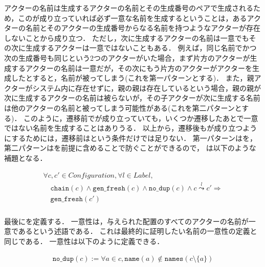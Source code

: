 アクターの名前は生成するアクターの名前とその生成番号のペアで生成されるため，この\fresh が成り立っていれば必ず一意な名前を生成するということは，あるアクターの名前とそのアクターの生成番号からなる名前を持つようなアクターが存在しないことから成り立つ．
ただし，次に生成するアクターの名前は一意でもその次に生成するアクターは一意ではないこともある．
例えば，同じ名前でかつ次の生成番号も同じという2つのアクターがいた場合，まず片方のアクターが生成するアクターの名前は一意だが，その次にもう片方のアクターがアクターを生成したとすると，名前が被ってしまう(これを第一パターンとする)．
また，親アクターがシステム内に存在せずに，親の親は存在しているという場合，親の親が次に生成するアクターの名前は被らないが，その子アクターが次に生成する名前は他のアクターの名前と被ってしまう可能性がある(これを第二パターンとする)．
このように，遷移前で\fresh が成り立っていても，いくつか遷移したあとで一意ではない名前を生成することはありうる．
以上から，遷移後も\fresh が成り立つようにするためには，遷移前は\fresh という条件だけでは足りない．
第一パターンは\nodup を，第二パターンは\chain を前提に含めることで防ぐことができるので，
\freshpreserv は以下のような補題となる．

\begin{lemma}{\freshpreserv}
\begin{displaymath}
  \begin{array}{l}
    \forall c, c' \in \textit{Configuration}, \forall l \in \textit{Label}, \\
    \quad \texttt{chain}(c) \wedge \texttt{gen\_fresh}(c) \wedge \texttt{no\_dup}(c) \wedge c \overset{l}{\leadsto} c' \Rightarrow \\
    \quad \texttt{gen\_fresh}(c')
  \end{array}
\end{displaymath}
\end{lemma}

\subsubsection{\nodup}

最後に\nodup を定義する．
一意性は，与えられた配置のすべてのアクターの名前が一意であるという述語である．
これは最終的に証明したい名前の一意性の定義と同じである．
一意性は以下のように定義できる．

\begin{definition}{\nodup}
\begin{displaymath}
  \begin{array}{l}
    \texttt{no\_dup}(c) :=
    \forall a \in c, \texttt{name}(a) \notin
    \texttt{names}(c \setminus \{a\})
  \end{array}
\end{displaymath}
\end{definition}

